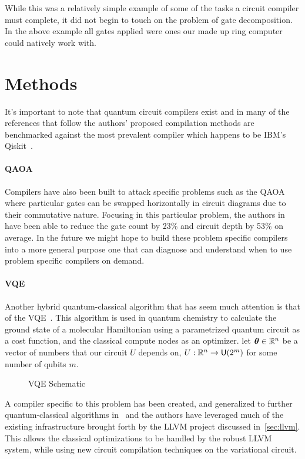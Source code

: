 While this was a relatively simple example of some of the tasks a circuit compiler must complete, it did not begin to touch on the problem of gate decomposition.
In the above example all gates applied were ones our made up ring computer could natively work with.


\section{Methods}

It's important to note that quantum circuit compilers exist and in many of the references that follow the authors' proposed compilation methods are benchmarked against the most prevalent compiler which happens to be IBM's Qiskit~\cite{qiskit}.

\paragraph{QAOA}
Compilers have also been built to attack specific problems such as the \ac{QAOA}~\cite{qaoa} where particular gates can be swapped horizontally in circuit diagrams due to their commutative nature.
Focusing in this particular problem, the authors in~\cite{qaoa-compiler} have been able to reduce the gate count by 23\% and circuit depth by 53\% on average.
In the future we might hope to build these problem specific compilers into a more general purpose one that can diagnose and understand when to use problem specific compilers on demand.

\paragraph{VQE}
Another hybrid quantum-classical algorithm that has seem much attention is that of the \ac{VQE}~\cite{vqe,vqe2}.
This algorithm is used in quantum chemistry to calculate the ground state of a molecular Hamiltonian using a parametrized quantum circuit as a cost function, and the classical compute nodes as an optimizer.
\Eg{} let $\boldsymbol{\theta} \in \mathbb{R}^n$ be a vector of numbers that our circuit $U$ depends on, \ie{} $U: \mathbb{R}^n \to \mathsf{U} (2^m)$ for some number of qubits $m$.
\begin{figure}[ht] %
    \centering
    
    \caption{\acs{VQE} Schematic}\label{fig:vqe}
\end{figure}
A compiler specific to this problem has been created, and generalized to further quantum-classical algorithms in~\cite{vqe-compiler} and the authors have leveraged much of the existing infrastructure brought forth by the LLVM project discussed in~\cref{sec:llvm}.
This allows the classical optimizations to be handled by the robust LLVM system, while using new circuit compilation techniques on the variational circuit.


